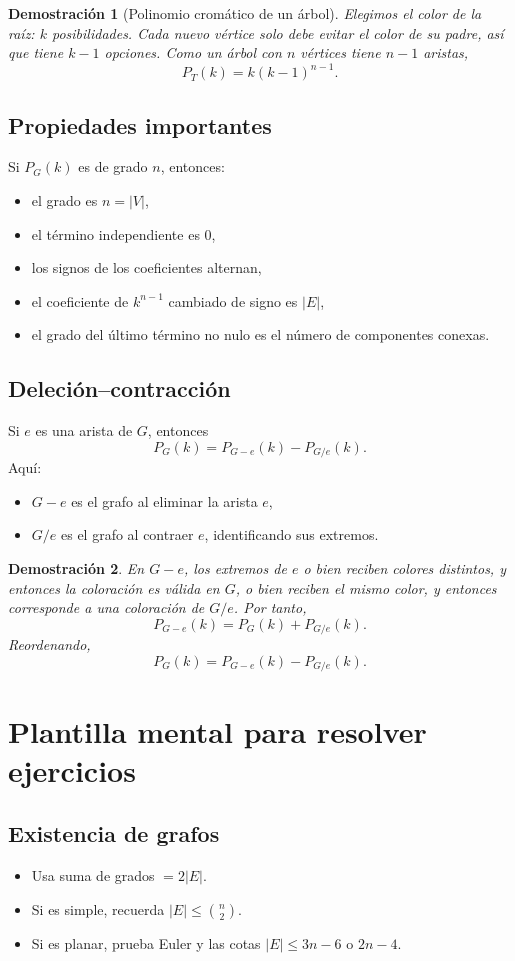 \documentclass[11pt,a4paper]{article}
\newtheorem*{dem}{Demostración}
\begin{document}
\begin{dem}[Polinomio cromático de un árbol]
Elegimos el color de la raíz: $k$ posibilidades. Cada nuevo vértice solo debe evitar el color de su padre, así que tiene $k-1$ opciones. Como un árbol con $n$ vértices tiene $n-1$ aristas,
\[
P_T(k)=k(k-1)^{n-1}.
\]
\end{dem}

\subsection{Propiedades importantes}
Si $P_G(k)$ es de grado $n$, entonces:
\begin{itemize}
    \item el grado es $n=|V|$,
    \item el término independiente es $0$,
    \item los signos de los coeficientes alternan,
    \item el coeficiente de $k^{n-1}$ cambiado de signo es $|E|$,
    \item el grado del último término no nulo es el número de componentes conexas.
\end{itemize}

\subsection{Deleción--contracción}
Si $e$ es una arista de $G$, entonces
\[
P_G(k)=P_{G-e}(k)-P_{G/e}(k).
\]
Aquí:
\begin{itemize}
    \item $G-e$ es el grafo al eliminar la arista $e$,
    \item $G/e$ es el grafo al contraer $e$, identificando sus extremos.
\end{itemize}

\begin{dem}
En $G-e$, los extremos de $e$ o bien reciben colores distintos, y entonces la coloración es válida en $G$, o bien reciben el mismo color, y entonces corresponde a una coloración de $G/e$. Por tanto,
\[
P_{G-e}(k)=P_G(k)+P_{G/e}(k).
\]
Reordenando,
\[
P_G(k)=P_{G-e}(k)-P_{G/e}(k).
\]
\end{dem}

\section{Plantilla mental para resolver ejercicios}

\subsection*{Existencia de grafos}
\begin{itemize}
    \item Usa suma de grados $=2|E|$.
    \item Si es simple, recuerda $|E|\le \binom{n}{2}$.
    \item Si es planar, prueba Euler y las cotas $|E|\le 3n-6$ o $2n-4$.
\end{itemize}
\end{document}
